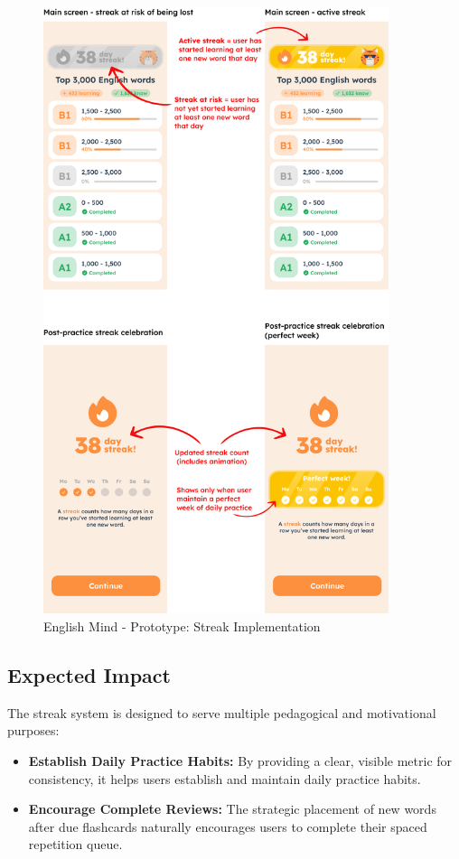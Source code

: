 \begin{figure}[!h]
    \includegraphics[width=0.9\textwidth]{src/figures/em-prototype-streak.png}
    \caption{English Mind - Prototype: Streak Implementation}
    \label{fig:em-prototype-streak}
\end{figure}

\subsection*{Expected Impact}

The streak system is designed to serve multiple pedagogical and motivational purposes:

\begin{itemize}
    \item \textbf{Establish Daily Practice Habits:} By providing a clear, visible metric for consistency, it helps users establish and maintain daily practice habits.
    
    \item \textbf{Encourage Complete Reviews:} The strategic placement of new words after due flashcards naturally encourages users to complete their spaced repetition queue.
\end{itemize}
